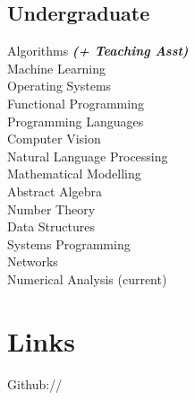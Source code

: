 \documentclass[]{deedy-resume-openfont}
\begin{document}
\begin{minipage}[t]{0.33\textwidth}
\subsection{Undergraduate}
Algorithms {\footnotesize \textit{\textbf{(+ Teaching Asst)}}}\\
Machine Learning \\
Operating Systems \\
Functional Programming \\
Programming Languages \\
Computer Vision \\
Natural Language Processing \\
Mathematical Modelling \\
Abstract Algebra\\
Number Theory\\
Data Structures\\
Systems Programming\\
Networks\\
Numerical Analysis (current)\\
\sectionsep


\section{Links}
Github:// \href{https://github.com/dtwitty}{}
\sectionsep

%
%

\end{minipage} 
\hfill
\end{document}
